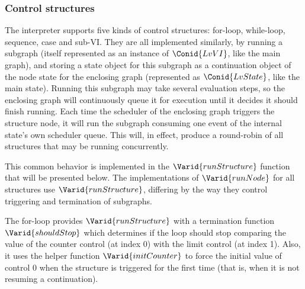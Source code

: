 \resethooks


\subsubsection{Control structures}

The interpreter supports five kinds of control structures: for-loop,
while-loop, sequence, case and sub-VI. They are all implemented similarly, by
running a subgraph (itself represented as an instance of \ensuremath{\Conid{LvVI}}, like the main
graph), and storing a state object for this subgraph as a continuation object
of the node state for the enclosing graph (represented as \ensuremath{\Conid{LvState}}, like the
main state). Running this subgraph may take several evaluation steps, so the
enclosing graph will continuously queue it for execution until it decides it
should finish running. Each time the scheduler of the enclosing graph triggers
the structure node, it will run the subgraph consuming one event of the
internal state's own scheduler queue. This will, in effect, produce a
round-robin of all structures that may be running concurrently.

This common behavior is implemented in the \ensuremath{\Varid{runStructure}} function that
will be presented below. The implementations of \ensuremath{\Varid{runNode}} for all
structures use \ensuremath{\Varid{runStructure}}, differing by the way they control
triggering and termination of subgraphs.


The for-loop provides \ensuremath{\Varid{runStructure}} with a termination function \ensuremath{\Varid{shouldStop}}
which determines if the loop should stop comparing the value of the counter
control (at index 0) with the limit control (at index 1). Also, it uses the
helper function \ensuremath{\Varid{initCounter}} to force the initial value of control 0 when the
structure is triggered for the first time (that is, when it is not resuming a
continuation).

